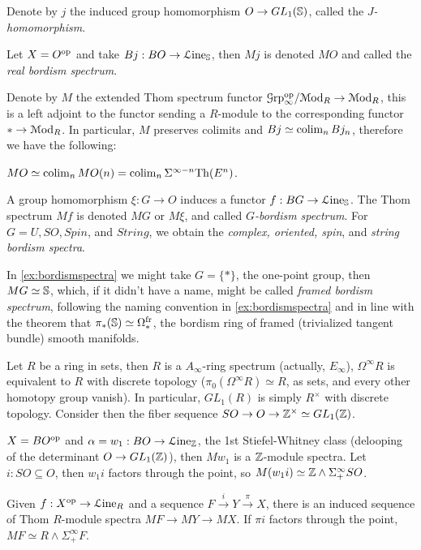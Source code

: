 \documentclass[10pt]{amsart}
\begin{document}
\begin{definition}
	Denote by $j$ the induced group homomorphism $O\to GL_1(\mathbb{S})$, called the \emph{$J$-homomorphism}.  
\end{definition} 
\begin{example}
	Let $X=O^{\mathrm{op}}$ and take $Bj:BO\to\mathcal{L}\mathrm{ine}_{\mathbb{S}}$, then $Mj$ is denoted $MO$ and called the \emph{real bordism spectrum}. 
\end{example}
Denote by $M$ the extended Thom spectrum functor $\mathcal{G}\mathrm{rp}^{\mathrm{op}}_\infty/\mathcal{M}\mathrm{od}_R\to\mathcal{M}\mathrm{od}_R$, this is a left adjoint to the functor sending a $R$-module to the corresponding functor $*\to\mathcal{M}\mathrm{od}_R$. In particular, $M$ preserves colimits and  $Bj\simeq\operatorname*{colim}_nBj_n$, therefore we have the following:
\begin{theorem}
	$MO\simeq\operatorname*{colim}_nMO(n)=\operatorname*{colim}_n\Sigma^{\infty-n}\mathrm{Th}(E^n)$. 
\end{theorem}
\begin{example}\label{ex:bordismspectra}
	A group homomorphism $\xi:G\to O$ induces a functor $f:BG\to\mathcal{L}\mathrm{ine}_{\mathbb{S}}$. The Thom spectrum $Mf$ is denoted $MG$ or $M\xi$, and called \emph{$G$-bordism spectrum}. For $G=U,SO,Spin$, and $String$, we obtain the \emph{complex, oriented, spin}, and \emph{string bordism spectra}. 
\end{example}
\begin{remark}
	In \cref{ex:bordismspectra} we might take $G=\{*\}$, the one-point group, then $MG\simeq\mathbb{S}$, which, if it didn't have a name, might be called \emph{framed bordism spectrum}, following the naming convention in \cref{ex:bordismspectra} and in line with the theorem that $\pi_*(\mathbb{S})\simeq\Omega^\mathrm{fr}_*$, the bordism ring of framed (trivialized tangent bundle) smooth manifolds.  
\end{remark}
Let $R$ be a ring in sets, then $R$ is a $A_\infty$-ring spectrum (actually, $E_\infty$), $\Omega^\infty R$ is equivalent to $R$ with discrete topology ($\pi_0(\Omega^\infty R)\simeq R$, as sets, and every other homotopy group vanish). In particular, $GL_1(R)$ is simply $R^\times$ with discrete topology. Consider then the fiber sequence $SO\to O\to \mathbb{Z}^\times\simeq GL_1(\mathbb{Z})$.
\begin{example}
	$X=BO^{\mathrm{op}}$ and $\alpha=w_1:BO\to\mathcal{L}\mathrm{ine}_{\mathbb{Z}}$, the 1st Stiefel-Whitney class (delooping of the determinant $O\to GL_1(\mathbb{Z})$), then $Mw_1$ is a $\mathbb{Z}$-module spectra. Let $i:SO\subseteq O$, then $w_1i$ factors through the point, so $M(w_1i)\simeq\mathbb{Z}\wedge\Sigma^\infty_+SO$. 
\end{example}
Given $f:X^{\mathrm{op}}\to\mathcal{L}\mathrm{ine}_R$ and a sequence $F\xrightarrow{i} Y\xrightarrow{\pi} X$, there is an induced sequence of Thom $R$-module spectra $MF\to MY\to MX$. If $\pi i$ factors through the point, $MF\simeq R\wedge\Sigma^\infty_+F$. 
\end{document}
